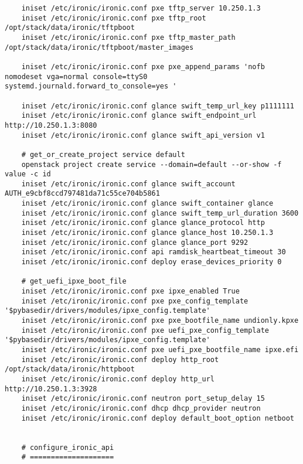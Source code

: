 \documentclass[a4paper,left=1.5cm,right=1.5cm,11pt]{article}
\begin{document}
\begin{lstlisting}
	iniset /etc/ironic/ironic.conf pxe tftp_server 10.250.1.3
    iniset /etc/ironic/ironic.conf pxe tftp_root /opt/stack/data/ironic/tftpboot
    iniset /etc/ironic/ironic.conf pxe tftp_master_path /opt/stack/data/ironic/tftpboot/master_images

	iniset /etc/ironic/ironic.conf pxe pxe_append_params 'nofb nomodeset vga=normal console=ttyS0 systemd.journald.forward_to_console=yes '

	iniset /etc/ironic/ironic.conf glance swift_temp_url_key p1111111
    iniset /etc/ironic/ironic.conf glance swift_endpoint_url http://10.250.1.3:8080
    iniset /etc/ironic/ironic.conf glance swift_api_version v1

	# get_or_create_project service default
	openstack project create service --domain=default --or-show -f value -c id
	iniset /etc/ironic/ironic.conf glance swift_account AUTH_e9cbf8ccd797481da71c55ce704b5861
    iniset /etc/ironic/ironic.conf glance swift_container glance
    iniset /etc/ironic/ironic.conf glance swift_temp_url_duration 3600
    iniset /etc/ironic/ironic.conf glance glance_protocol http
    iniset /etc/ironic/ironic.conf glance glance_host 10.250.1.3
    iniset /etc/ironic/ironic.conf glance glance_port 9292
	iniset /etc/ironic/ironic.conf api ramdisk_heartbeat_timeout 30
	iniset /etc/ironic/ironic.conf deploy erase_devices_priority 0

	# get_uefi_ipxe_boot_file
	iniset /etc/ironic/ironic.conf pxe ipxe_enabled True
    iniset /etc/ironic/ironic.conf pxe pxe_config_template '$pybasedir/drivers/modules/ipxe_config.template'
    iniset /etc/ironic/ironic.conf pxe pxe_bootfile_name undionly.kpxe
    iniset /etc/ironic/ironic.conf pxe uefi_pxe_config_template '$pybasedir/drivers/modules/ipxe_config.template'
    iniset /etc/ironic/ironic.conf pxe uefi_pxe_bootfile_name ipxe.efi
    iniset /etc/ironic/ironic.conf deploy http_root /opt/stack/data/ironic/httpboot
    iniset /etc/ironic/ironic.conf deploy http_url http://10.250.1.3:3928
	iniset /etc/ironic/ironic.conf neutron port_setup_delay 15
	iniset /etc/ironic/ironic.conf dhcp dhcp_provider neutron
    iniset /etc/ironic/ironic.conf deploy default_boot_option netboot


	# configure_ironic_api
	# ====================


\end{lstlisting}
\end{document}
